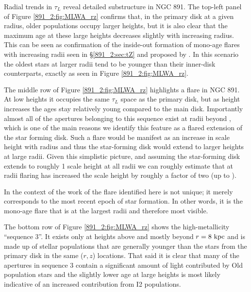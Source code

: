 
Radial trends in $\tau_L$ reveal detailed substructure in NGC 891. The
top-left panel of Figure \ref{891_2:fig:MLWA_rz} confirms that, in the
primary disk at a given radius, older populations occupy larger
heights, but it is also clear that the maximum age at these large
heights decreases slightly with increasing radius. This can be seen as
confirmation of the inside-out formation of mono-age flares with
increasing radii seen in \S\ref{891_2:sec:tZ} and proposed by
\citet{Martig14a}. In this scenario the oldest stars at larger radii
tend to be younger than their inner-disk counterparts, exactly as seen
in Figure \ref{891_2:fig:MLWA_rz}.


The middle row of Figure \ref{891_2:fig:MLWA_rz} highlights a flare in
NGC 891. At low heights it occupies the same $\tau_L$ space as the
primary disk, but as height increases the ages stay relatively young
compared to the main disk. Importantly almost all of the apertures
belonging to this sequence exist at radii beyond , which
is one of the main reasons we identify this feature as a flared
extension of the star forming disk. Such a flare would be manifest as
an increase in scale height with radius and thus the star-forming disk
would extend to larger heights at large radii. Given this simplistic
picture, and assuming the star-forming disk extends to roughly 1 scale
height at all radii we can roughly estimate that at radii  flaring has increased the scale height by roughly a factor
of two (up to ).

In the context of the work of \citet{Martig14a} the flare identified
here is not unique; it merely corresponds to the most recent epoch of
star formation. In other words, it is the mono-age flare that is at
the largest radii and therefore most visible.


The bottom row of Figure \ref{891_2:fig:MLWA_rz} shows the
high-metallicity ``sequence 3''. It exists only at heights above
 and mostly beyond $r = 8~\mathrm{kpc} $ and is made up of
stellar populations that are generally younger than the stars from the
primary disk in the same ($r,z$) locations. That said it is clear that
many of the apertures in sequence 3 contain a significant amount of
light contributed by Old population stars and the slightly lower age
at large heights is most likely indicative of an increased
contribution from I2 populations.

